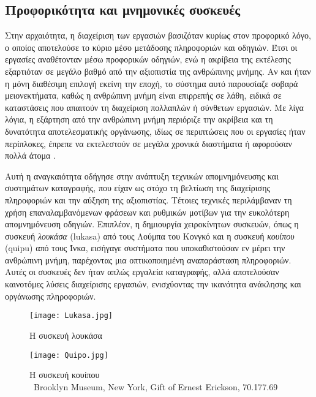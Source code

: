         \subsection{Προφορικότητα και μνημονικές συσκευές}
            Στην αρχαιότητα, η διαχείριση των εργασιών βασιζόταν κυρίως στον προφορικό λόγο, ο οποίος αποτελούσε το κύριο μέσο μετάδοσης πληροφοριών και οδηγιών. Έτσι οι εργασίες αναθέτονταν μέσω προφορικών οδηγιών, ενώ η ακρίβεια της εκτέλεσης εξαρτιόταν σε μεγάλο βαθμό από την αξιοπιστία της ανθρώπινης μνήμης. Αν και ήταν η μόνη διαθέσιμη επιλογή εκείνη την εποχή, το σύστημα αυτό παρουσίαζε σοβαρά μειονεκτήματα, καθώς η ανθρώπινη μνήμη είναι επιρρεπής σε λάθη, ειδικά σε καταστάσεις που απαιτούν τη διαχείριση πολλαπλών ή σύνθετων εργασιών. Με λίγα λόγια, η εξάρτηση από την ανθρώπινη μνήμη περιόριζε την ακρίβεια και τη δυνατότητα αποτελεσματικής οργάνωσης, ιδίως σε περιπτώσεις που οι εργασίες ήταν περίπλοκες, έπρεπε να εκτελεστούν σε μεγάλα χρονικά διαστήματα ή αφορούσαν πολλά άτομα \cite{Goody2013}.

            Αυτή η αναγκαιότητα οδήγησε στην ανάπτυξη τεχνικών απομνημόνευσης και συστημάτων καταγραφής, που είχαν ως στόχο τη βελτίωση της διαχείρισης πληροφοριών και την αύξηση της αξιοπιστίας. Τέτοιες τεχνικές περιλάμβαναν τη χρήση επαναλαμβανόμενων φράσεων και ρυθμικών μοτίβων για την ευκολότερη απομνημόνευση οδηγιών. Επιπλέον, η δημιουργία χειροκίνητων συσκευών, όπως η συσκευή \textit{λουκάσα} (lukasa) από τους Λούμπα του Κονγκό και η συσκευή \textit{κουίπου} (quipu) από τους Ίνκα, εισήγαγε συστήματα που υποκαθιστούσαν εν μέρει την ανθρώπινη μνήμη, παρέχοντας μια οπτικοποιημένη αναπαράσταση πληροφοριών. Αυτές οι συσκευές δεν ήταν απλώς εργαλεία καταγραφής, αλλά αποτελούσαν καινοτόμες λύσεις διαχείρισης εργασιών, ενισχύοντας την ικανότητα ανάκλησης και οργάνωσης πληροφοριών.

            \begin{figure}[h!] \noindent \centering
                \texttt{[image: Lukasa.jpg]}
                \caption{Η συσκευή λουκάσα \cite{Lukasa}}
                \label{fig:Lukasa}
            \end{figure}

            \begin{figure}[h!] \noindent \centering
                \texttt{[image: Quipo.jpg]}
                \caption{\centering Η συσκευή κουίπου \\ {\footnotesize \textcopyright\ Brooklyn Museum, New York, Gift of Ernest Erickson, 70.177.69}}
                \label{fig:Quipo}
            \end{figure}

